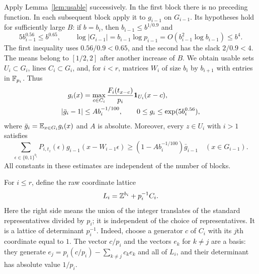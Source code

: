 Apply Lemma~\ref{lem:usable} successively.  In the first block there is no
preceding function.  In each subsequent block apply it to $g_{i-1}$ on
$G_{i-1}$.  Its hypotheses hold for sufficiently large $B$: if $b=b_i$,
then $b_{i-1}\le b^{1/0.9}$ and
\[
 5b_{i-1}^{0.56}\le b^{0.65},\qquad
 \log|G_{i-1}|=b_{i-1}\log p_{i-1}
       =O(b_{i-1}^2\log b_{i-1})\le b^4.
\]
The first inequality uses $0.56/0.9<0.65$, and the second has the slack
$2/0.9<4$.  The means belong to $[1/2,2]$ after another increase of $B$.
We obtain usable sets $U_i\subset G_i$, lines $C_i\subset G_i$, and, for
$i<r$, matrices $W_i$ of size $b_i$ by $b_{i+1}$ with entries in $\mathbb F_{p_i}$.
Thus
\begin{equation}
 \begin{split}
 g_i(x)&=\max_{c\in C_i}
       \frac{F_i(t_{x-c})}{p_i}\mathbf 1_{U_i}(x-c),\\
 |\bar g_i-1|&\le A b_i^{-1/100},\qquad
 0\le g_i\le \exp(5b_i^{0.56}),
 \end{split}
 \label{eq:hierarchy-functions}
\end{equation}
where $\bar g_i=\mathbb E_{x\in G_i}g_i(x)$ and $A$ is absolute.  Moreover, every
$z\in U_i$ with $i>1$ satisfies
\begin{equation}
 \sum_{\epsilon\in\{0,1\}^{b_i}} P_{i,t_z}(\epsilon)
       g_{i-1}(x-W_{i-1}\epsilon)
 \ge (1-A b_i^{-1/100})\bar g_{i-1}
 \quad (x\in G_{i-1}).
 \label{eq:hierarchy-biased-sampler}
\end{equation}
All constants in these estimates are independent of the number of blocks.

For $i\le r$, define the raw coordinate lattice
\begin{equation}
 L_i=\mathbb Z^{b_i}+p_i^{-1}C_i.
 \label{eq:hierarchy-raw-lattice}
\end{equation}
Here the right side means the union of the integer translates of the
standard representatives divided by $p_i$; it is independent of the choice
of representatives.  It is a lattice of determinant $p_i^{-1}$.  Indeed,
choose a generator $c$ of $C_i$ with its $j$th coordinate equal to $1$.
The vector $c/p_i$ and the vectors $e_k$ for $k\ne j$ are a basis:
they generate $e_j=p_i(c/p_i)-\sum_{k\ne j}c_k e_k$ and all of $L_i$,
and their determinant has absolute value $1/p_i$.

